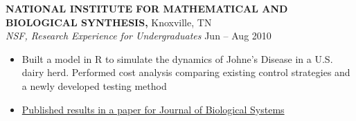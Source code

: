 \documentclass[geomargin]{res}
\begin{document}
\begin{resume}
{\bf NATIONAL INSTITUTE FOR MATHEMATICAL AND BIOLOGICAL SYNTHESIS,} Knoxville, TN \\
{\em NSF, Research Experience for Undergraduates}    \hfill
Jun -- Aug 2010 \\                                          \vspace{-4mm}
\begin{itemize}                                         \itemsep1pt 
        \item Built a model in R to simulate the dynamics of Johne's Disease in a U.S. dairy herd. Performed cost analysis comparing existing control strategies and a newly developed testing method
        \item \href{http://www.worldscientific.com/doi/abs/10.1142/S021833901340010X}{Published results in a paper for Journal of Biological Systems}
\end{itemize}
\vspace{-1mm}








\end{resume}
\end{document}
